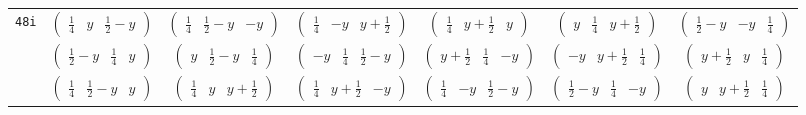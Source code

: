 \documentclass[fleqn,9pt,landscape]{jsarticle}
\begin{document}
\begin{center}
\begin{longtable}{ccccccc}
{\tt 48i} & $ \begin{pmatrix} \frac{1}{4} & y & \frac{1}{2} - y \end{pmatrix} $ & $ \begin{pmatrix} \frac{1}{4} & \frac{1}{2} - y & - y \end{pmatrix} $ & $ \begin{pmatrix} \frac{1}{4} & - y & y + \frac{1}{2} \end{pmatrix} $ & $ \begin{pmatrix} \frac{1}{4} & y + \frac{1}{2} & y \end{pmatrix} $ & $ \begin{pmatrix} y & \frac{1}{4} & y + \frac{1}{2} \end{pmatrix} $ & $ \begin{pmatrix} \frac{1}{2} - y & - y & \frac{1}{4} \end{pmatrix} $ \\
& $ \begin{pmatrix} \frac{1}{2} - y & \frac{1}{4} & y \end{pmatrix} $ & $ \begin{pmatrix} y & \frac{1}{2} - y & \frac{1}{4} \end{pmatrix} $ & $ \begin{pmatrix} - y & \frac{1}{4} & \frac{1}{2} - y \end{pmatrix} $ & $ \begin{pmatrix} y + \frac{1}{2} & \frac{1}{4} & - y \end{pmatrix} $ & $ \begin{pmatrix} - y & y + \frac{1}{2} & \frac{1}{4} \end{pmatrix} $ & $ \begin{pmatrix} y + \frac{1}{2} & y & \frac{1}{4} \end{pmatrix} $ \\
& $ \begin{pmatrix} \frac{1}{4} & \frac{1}{2} - y & y \end{pmatrix} $ & $ \begin{pmatrix} \frac{1}{4} & y & y + \frac{1}{2} \end{pmatrix} $ & $ \begin{pmatrix} \frac{1}{4} & y + \frac{1}{2} & - y \end{pmatrix} $ & $ \begin{pmatrix} \frac{1}{4} & - y & \frac{1}{2} - y \end{pmatrix} $ & $ \begin{pmatrix} \frac{1}{2} - y & \frac{1}{4} & - y \end{pmatrix} $ & $ \begin{pmatrix} y & y + \frac{1}{2} & \frac{1}{4} \end{pmatrix} $ \\

\end{longtable}
\end{center}
\end{document}
